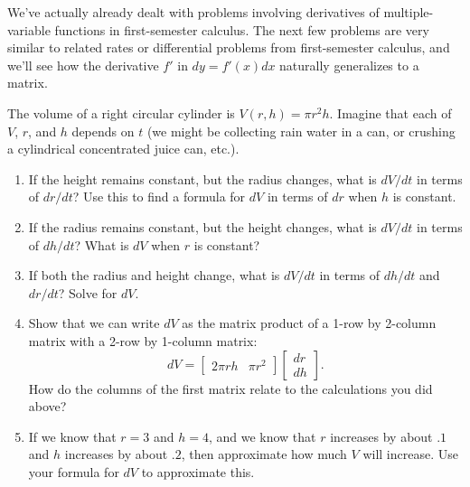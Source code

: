 We've actually already dealt with problems involving derivatives of multiple-variable functions in first-semester calculus.  The next few problems are very similar to related rates or differential problems from first-semester calculus, and we'll see how the derivative $f'$ in $dy=f'(x) dx$ naturally generalizes to a matrix.
\begin{problem}\label{differential for volume of a cylinder}%
%
 The volume of a right circular cylinder is $V(r,h)= \pi r^2 h$.  Imagine that each of $V$, $r$, and $h$ depends on $t$ (we might be collecting rain water in a can, or crushing a cylindrical concentrated juice can, etc.).
\begin{enumerate}
 \item If the height remains constant, but the radius changes, what is $dV/dt$ in terms of $dr/dt$? Use this to find a formula for $dV$ in terms of $dr$ when $h$ is constant.
 \item If the radius remains constant, but the height changes, what is $dV/dt$ in terms of $dh/dt$? What is $dV$ when $r$ is constant?
 \item If both the radius and height change, what is $dV/dt$ in terms of $dh/dt$ and $dr/dt$? Solve for $dV$.
 \item%
%
Show that we can write $dV$ as the matrix product of a 1-row by 2-column matrix with a 2-row by 1-column matrix:
$$dV = \begin{bmatrix}2\pi rh& \pi r^2\end{bmatrix}\begin{bmatrix}dr\\dh\end{bmatrix}.$$ 
How do the columns of the first matrix relate to the calculations you did above?
 \item{}%
 If we know that $r=3$ and $h=4$, and we know that $r$ increases by about $.1$ and $h$ increases by about $.2$, then approximate how much $V$ will increase.  Use your formula for $dV$ to approximate this.
\end{enumerate}
\end{problem}

